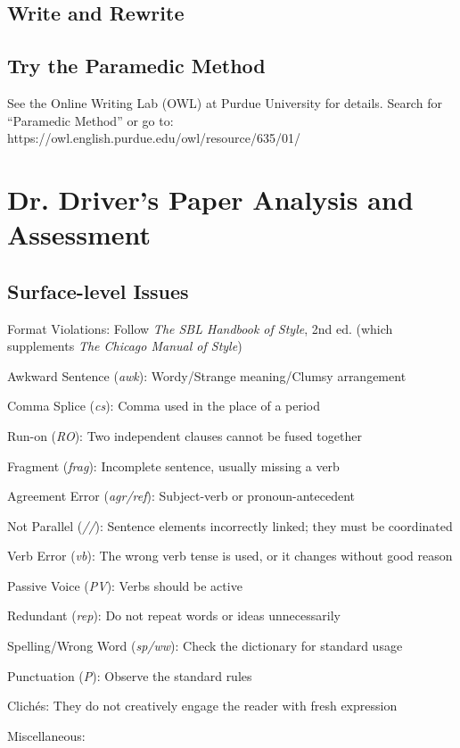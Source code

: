 \documentclass[11pt,twocolumn]{article}
\begin{document}
\subsection{Write and Rewrite}

\subsection{Try the Paramedic Method}

See the Online Writing Lab (OWL) at Purdue University for details.
Search for “Paramedic Method” or go to:
https://owl.english.purdue.edu/owl/resource/635/01/

\onecolumn
\thispagestyle{empty}
\section*{Dr. Driver's Paper Analysis and Assessment}

\subsection*{Surface-level Issues}

\begin{issues}

\item Format Violations: Follow \emph{The SBL Handbook of Style}, 2nd ed. (which supplements \emph{The Chicago Manual of Style})
\item Awkward Sentence (\emph{awk}): Wordy/Strange meaning/Clumsy arrangement
\item Comma Splice (\emph{cs}): Comma used in the place of a period
\item Run-on (\emph{RO}): Two independent clauses cannot be fused together
\item Fragment (\emph{frag}): Incomplete sentence, usually missing a verb
\item Agreement Error (\emph{agr/ref}): Subject-verb or pronoun-antecedent
\item Not Parallel (\emph{//}): Sentence elements incorrectly linked; they must be coordinated
\item Verb Error (\emph{vb}): The wrong verb tense is used, or it changes without good reason
\item Passive Voice (\emph{PV}): Verbs should be active
\item Redundant (\emph{rep}): Do not repeat words or ideas unnecessarily
\item Spelling/Wrong Word (\emph{sp/ww}): Check the dictionary for standard usage
\item Punctuation (\emph{P}): Observe the standard rules
\item Clichés: They do not creatively engage the reader with fresh expression
\item Miscellaneous:

\end{issues}
\end{document}
